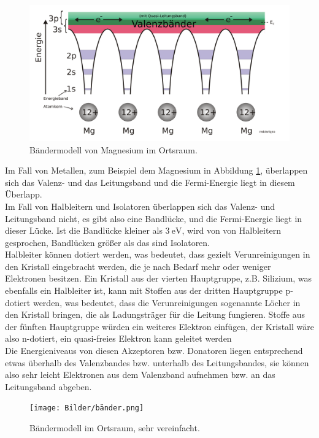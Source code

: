 \begin{figure}[H]
    \centering
    \includegraphics[width=\textwidth]{Bilder/Bändermodell-Potentialtöpfe-Mg.svg.png}
    \caption{Bändermodell von Magnesium im Ortsraum. \cite{magnesium} }
    \label{fig:magnesium}
\end{figure}
Im Fall von Metallen, zum Beispiel dem Magnesium in Abbildung \ref{fig:magnesium},
überlappen sich das Valenz- und das Leitungsband und die Fermi-Energie liegt in diesem Überlapp. \\
Im Fall von Halbleitern und Isolatoren überlappen sich das Valenz- und Leitungsband nicht, es gibt also eine Bandlücke, und die Fermi-Energie liegt in dieser Lücke. Ist die Bandlücke kleiner als $\qty{3}{\electronvolt}$, wird von von Halbleitern gesprochen,
Bandlücken größer als das sind Isolatoren. \\
Halbleiter können dotiert werden, was bedeutet, dass gezielt Verunreinigungen in den Kristall eingebracht werden, die je nach Bedarf mehr oder weniger Elektronen besitzen.
Ein Kristall aus der vierten Hauptgruppe, z.B. Silizium, was ebenfalls ein Halbleiter ist, kann mit Stoffen aus der dritten Hauptgruppe p-dotiert werden, was bedeutet, dass die Verunreinigungen sogenannte Löcher
in den Kristall bringen, die als Ladungsträger für die Leitung fungieren. Stoffe aus der fünften Hauptgruppe würden ein weiteres Elektron einfügen, der Kristall wäre also n-dotiert, ein quasi-freies Elektron kann geleitet werden\\
Die Energieniveaus von diesen Akzeptoren bzw. Donatoren liegen entsprechend etwas überhalb des Valenzbandes bzw. unterhalb des Leitungsbandes, sie können also sehr leicht Elektronen aus dem Valenzband aufnehmen bzw. an das Leitungsband abgeben.

\begin{figure}[H]
    \centering
    \texttt{[image: Bilder/bänder.png]}
    \caption{Bändermodell im Ortsraum, sehr vereinfacht. \cite{magnesium}}
    \label{fig:bänder}
\end{figure}

